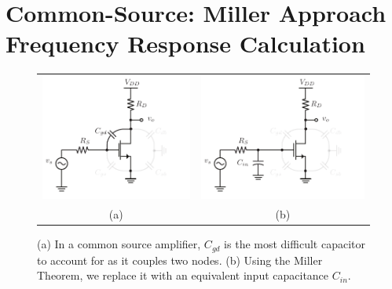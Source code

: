 \section{Common-Source:  Miller Approach Frequency Response Calculation}
\begin{figure}[tb]
\begin{center}
\begin{tabular}{cc}
\includegraphics[scale=1]{cs_amp_cgd} &
\includegraphics[scale=1]{cs_amp_cgd_miller} \\
(a) & (b) \\
\end{tabular}
\end{center}
\caption{(a) In a common source amplifier, $C_{gd}$ is the most difficult capacitor to account for as it couples two nodes.  (b) Using the Miller Theorem, we replace it with an equivalent input capacitance $C_{in}$.}
\label{fig:cs_amp_cgd}
\end{figure}

